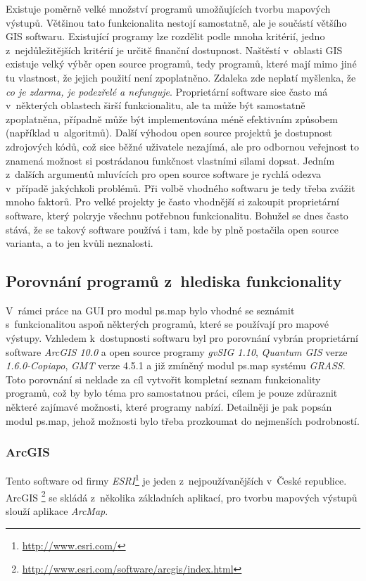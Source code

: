 \documentclass[a4paper,12pt,draft]{article}
\begin{document}
Existuje poměrně velké množství programů umožňujících tvorbu
mapových výstupů. Většinou tato funkcionalita nestojí samostatně,
ale je součástí většího GIS softwaru. Existující programy lze
rozdělit podle mnoha kritérií, jedno z~nejdůležitějších
kritérií je určitě finanční dostupnost. Naštěstí v~oblasti GIS
existuje velký výběr open source programů, tedy programů, které mají mimo jiné
tu vlastnost, že jejich
použití není zpoplatněno. Zdaleka zde neplatí myšlenka, že \emph{co je
zdarma, je podezřelé a nefunguje}. Proprietární software sice často má
v~některých oblastech širší funkcionalitu, ale ta může být samostatně
zpoplatněna, případně může být implementována méně efektivním
způsobem (například u~algoritmů). Další výhodou open source projektů
je dostupnost zdrojových kódů, což sice běžné uživatele nezajímá,
ale pro odbornou veřejnost to znamená možnost si postrádanou funkčnost
vlastními silami dopsat. Jedním z~dalších argumentů mluvících pro open
source software je rychlá odezva v~případě jakýchkoli problémů. Při
volbě vhodného softwaru je tedy třeba zvážit mnoho faktorů. Pro
velké projekty je často vhodnější si zakoupit proprietární software, který
pokryje všechnu potřebnou funkcionalitu. Bohužel se dnes často stává, že
se takový software používá i tam, kde by plně postačila
open source varianta, a to jen kvůli neznalosti.


\subsection{Porovnání  programů z~hlediska funkcionality}
V~rámci práce na GUI pro modul ps.map bylo
vhodné se seznámit s~funkcionalitou aspoň některých programů, které
se používají pro mapové výstupy. Vzhledem k~dostupnosti softwaru byl
pro porovnání vybrán proprietární software \emph{ArcGIS 10.0} %
a open source programy \emph{gvSIG 1.10}, \emph{Quantum GIS} verze
\emph{1.6.0-Copiapo}, \emph{GMT} verze 4.5.1 a již zmíněný modul ps.map
systému \emph{GRASS}.
Toto porovnání si neklade za cíl vytvořit kompletní seznam
funkcionality programů, což by bylo téma pro samostatnou práci,
cílem je pouze zdůraznit některé zajímavé možnosti, které programy
nabízí. Detailněji je pak popsán modul ps.map, jehož možnosti
bylo třeba prozkoumat do nejmenších podrobností.

\subsubsection{ArcGIS}
\label{sec:porovnani_moznosti:ArcGIS}
Tento software od firmy \emph{ESRI}\footnote{\url{http://www.esri.com/}} je
jeden z~nejpoužívanějších
v~České republice. ArcGIS
\footnote{\url{http://www.esri.com/software/arcgis/index.html}} se skládá
z~několika základních aplikací,
pro tvorbu mapových výstupů slouží aplikace \emph{ArcMap}.
\end{document}
